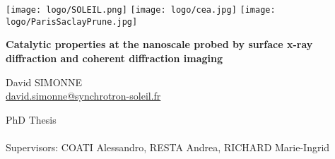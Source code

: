 \begin{titlepage}
\texttt{[image: logo/SOLEIL.png]}
\hspace{2.7cm}
\texttt{[image: logo/cea.jpg]}
\hspace{2.7cm}
\texttt{[image: logo/ParisSaclayPrune.jpg]}

\vspace{1.1cm}
    \begin{center}
        \vspace*{1cm}
        
        {\begin{spacing}{1.0}
        \LARGE \textbf{Catalytic properties at the nanoscale probed by surface x-ray diffraction and coherent diffraction imaging}
        \end{spacing}}
        
        \vspace{1.1cm}
        David SIMONNE\\
        \url{david.simonne@synchrotron-soleil.fr}
                
        \vspace{1.0cm}
    \end{center}


\vfill
\textcolor[rgb]{0.5,0.5,0.5}{
    \begin{flushleft}
    { \footnotesize
    PhD Thesis\\
    \thedate\\
    Supervisors: COATI Alessandro, RESTA Andrea, RICHARD Marie-Ingrid\\
    }
    \end{flushleft}
}
      
\end{titlepage}